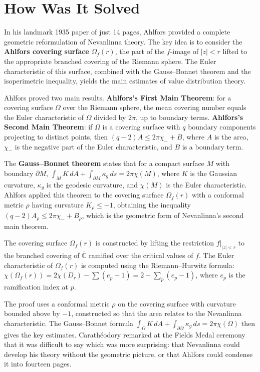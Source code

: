 \section{How Was It Solved}

In his landmark 1935 paper of just 14 pages, Ahlfors provided a complete geometric reformulation of Nevanlinna theory. The key idea is to consider the \textbf{Ahlfors covering surface} $\Omega_f(r)$, the part of the $f$-image of $|z| < r$ lifted to the appropriate branched covering of the Riemann sphere. The Euler characteristic of this surface, combined with the Gauss--Bonnet theorem and the isoperimetric inequality, yields the main estimates of value distribution theory.

Ahlfors proved two main results. \textbf{Ahlfors's First Main Theorem}: for a covering surface $\Omega$ over the Riemann sphere, the mean covering number equals the Euler characteristic of $\Omega$ divided by $2\pi$, up to boundary terms. \textbf{Ahlfors's Second Main Theorem}: if $\Omega$ is a covering surface with $q$ boundary components projecting to distinct points, then $(q-2)A \leq 2\pi\chi_{-} + B$, where $A$ is the area, $\chi_{-}$ is the negative part of the Euler characteristic, and $B$ is a boundary term.

The \textbf{Gauss--Bonnet theorem} states that for a compact surface $M$ with boundary $\partial M$, $\int_M K \, dA + \int_{\partial M} \kappa_g \, ds = 2\pi \chi(M)$, where $K$ is the Gaussian curvature, $\kappa_g$ is the geodesic curvature, and $\chi(M)$ is the Euler characteristic. Ahlfors applied this theorem to the covering surface $\Omega_f(r)$ with a conformal metric $\rho$ having curvature $K_\rho \leq -1$, obtaining the inequality $(q-2)A_\rho \leq 2\pi\chi_{-} + B_\rho$, which is the geometric form of Nevanlinna's second main theorem.

The covering surface $\Omega_f(r)$ is constructed by lifting the restriction $f|_{|z|<r}$ to the branched covering of $\overline{\mathbb{C}}$ ramified over the critical values of $f$. The Euler characteristic of $\Omega_f(r)$ is computed using the Riemann--Hurwitz formula: $\chi(\Omega_f(r)) = 2\chi(D_r) - \sum (e_p - 1) = 2 - \sum_{p} (e_p - 1)$, where $e_p$ is the ramification index at $p$.

The proof uses a conformal metric $\rho$ on the covering surface with curvature bounded above by $-1$, constructed so that the area relates to the Nevanlinna characteristic. The Gauss--Bonnet formula $\int_\Omega K\, dA + \int_{\partial\Omega} \kappa_g \, ds = 2\pi\chi(\Omega)$ then gives the key estimates. Carath\'{e}odory remarked at the Fields Medal ceremony that it was difficult to say which was more surprising: that Nevanlinna could develop his theory without the geometric picture, or that Ahlfors could condense it into fourteen pages.

